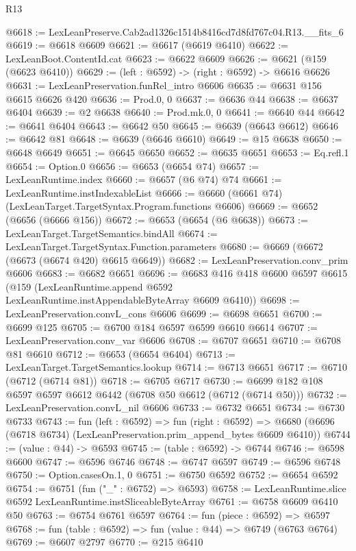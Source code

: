 \begin{lexlean}{R13}
\begin{coremodule}
@6618 := LexLeanPreserve.Cab2ad1326c1514b8416cd7d8fd767c04.R13.__fits_6
@6619 := @6618 @6609
@6621 := @6617 (@6619 @6410)
@6622 := LexLeanBoot.ContentId.cat
@6623 := @6622 @6609
@6626 := @6621 (@159 (@6623 @6410))
@6629 := (left : @6592) -> (right : @6592) -> @6616 @6626
@6631 := LexLeanPreservation.funRel_intro @6606
@6635 := @6631 @156 @6615 @6626 @420
@6636 := Prod.{0, 0}
@6637 := @6636 @44
@6638 := @6637 @6404
@6639 := @2 @6638
@6640 := Prod.mk.{0, 0}
@6641 := @6640 @44
@6642 := @6641 @6404
@6643 := @6642 @50
@6645 := @6639 (@6643 @6612)
@6646 := @6642 @81
@6648 := @6639 (@6646 @6610)
@6649 := @15 @6638
@6650 := @6648 @6649
@6651 := @6645 @6650
@6652 := @6635 @6651
@6653 := Eq.refl.{1}
@6654 := Option.{0}
@6656 := @6653 (@6654 @74)
@6657 := LexLeanRuntime.index
@6660 := @6657 (@6 @74) @74
@6661 := LexLeanRuntime.instIndexableList
@6666 := @6660 (@6661 @74) (LexLeanTarget.TargetSyntax.Program.functions @6606)
@6669 := @6652 (@6656 (@6666 @156))
@6672 := @6653 (@6654 (@6 @6638))
@6673 := LexLeanTarget.TargetSemantics.bindAll
@6674 := LexLeanTarget.TargetSyntax.Function.parameters
@6680 := @6669 (@6672 (@6673 (@6674 @420) @6615 @6649))
@6682 := LexLeanPreservation.conv_prim @6606
@6683 := @6682 @6651
@6696 := @6683
    @416
    @418
    @6600
    @6597
    @6615
    (@159 (LexLeanRuntime.append @6592 LexLeanRuntime.instAppendableByteArray @6609 @6410))
@6698 := LexLeanPreservation.convL_cons @6606
@6699 := @6698 @6651
@6700 := @6699 @125
@6705 := @6700 @184 @6597 @6599 @6610 @6614
@6707 := LexLeanPreservation.conv_var @6606
@6708 := @6707 @6651
@6710 := @6708 @81 @6610
@6712 := @6653 (@6654 @6404)
@6713 := LexLeanTarget.TargetSemantics.lookup
@6714 := @6713 @6651
@6717 := @6710 (@6712 (@6714 @81))
@6718 := @6705 @6717
@6730 := @6699 @182 @108 @6597 @6597 @6612 @6442 (@6708 @50 @6612 (@6712 (@6714 @50)))
@6732 := LexLeanPreservation.convL_nil @6606
@6733 := @6732 @6651
@6734 := @6730 @6733
@6743 := fun (left : @6592) =>
  fun (right : @6592) =>
  @6680 (@6696 (@6718 @6734) (LexLeanPreservation.prim_append_bytes @6609 @6410))
@6744 := (value : @44) -> @6593
@6745 := (table : @6592) -> @6744
@6746 := @6598 @6600
@6747 := @6596 @6746
@6748 := @6747 @6597
@6749 := @6596 @6748
@6750 := Option.casesOn.{1, 0}
@6751 := @6750 @6592
@6752 := @6654 @6592
@6754 := @6751 (fun ("_" : @6752) => @6593)
@6758 := LexLeanRuntime.slice @6592 LexLeanRuntime.instSliceableByteArray
@6761 := @6758 @6609 @6410 @50
@6763 := @6754 @6761 @6597
@6764 := fun (piece : @6592) => @6597
@6768 := fun (table : @6592) => fun (value : @44) => @6749 (@6763 @6764)
@6769 := @6607 @2797
@6770 := @215 @6410

\end{coremodule}
\end{lexlean}
